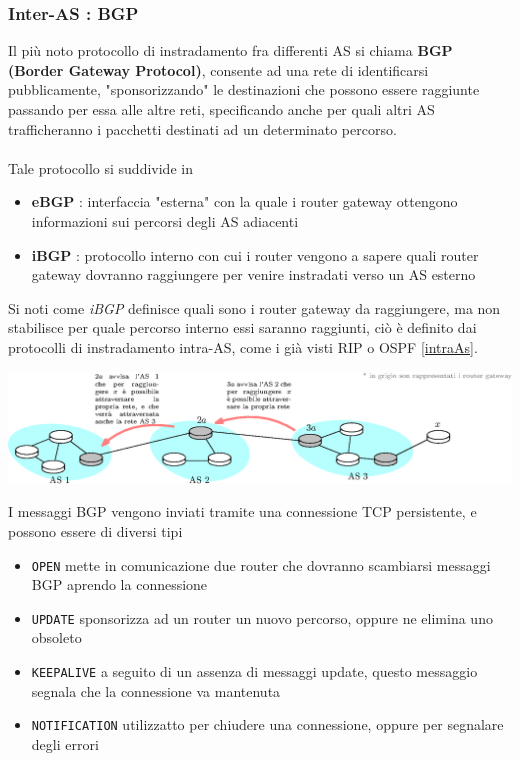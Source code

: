 \documentclass[12pt, letterpaper]{article}
\newcommand{\code}[1]{\colorbox{light-gray}{\texttt{#1}}}
\newcommand{\acc}{\\\hphantom{}\\}
\begin{document}
\subsubsection{Inter-AS : BGP}
Il più noto protocollo di instradamento fra differenti AS si chiama \textbf{BGP (Border Gateway Protocol)}, consente ad una 
rete di identificarsi pubblicamente, "sponsorizzando" le destinazioni che possono essere raggiunte passando per essa alle 
altre reti, specificando anche per quali altri AS trafficheranno i pacchetti destinati ad un 
determinato percorso.\acc Tale protocollo si suddivide in\begin{itemize}
    \item \textbf{eBGP} : interfaccia "esterna" con la quale i router gateway ottengono informazioni sui percorsi 
    degli AS adiacenti 
    \item \textbf{iBGP} : protocollo interno con cui i router vengono a sapere quali router gateway dovranno 
    raggiungere per venire instradati verso un AS esterno
\end{itemize}
Si noti come \textit{iBGP} definisce quali sono i router gateway da raggiungere, ma non stabilisce per quale percorso 
interno essi saranno raggiunti, ciò è definito dai protocolli di instradamento intra-AS, come i già visti RIP o 
OSPF \ref{intraAs}.\begin{center}
    \includegraphics[width=1.1\textwidth ]{images/BGP.eps}
\end{center}
I messaggi BGP vengono inviati tramite una connessione TCP persistente, e possono essere di diversi tipi\begin{itemize}
    \item \code{OPEN} mette in comunicazione due router che dovranno scambiarsi messaggi BGP aprendo la connessione 
    \item \code{UPDATE} sponsorizza ad un router un nuovo percorso, oppure ne elimina uno obsoleto 
    \item \code{KEEPALIVE} a seguito di un assenza di messaggi update, questo messaggio segnala che la connessione 
    va mantenuta 
    \item \code{NOTIFICATION} utilizzatto per chiudere una connessione, oppure per segnalare degli errori 
\end{itemize}
\end{document}
